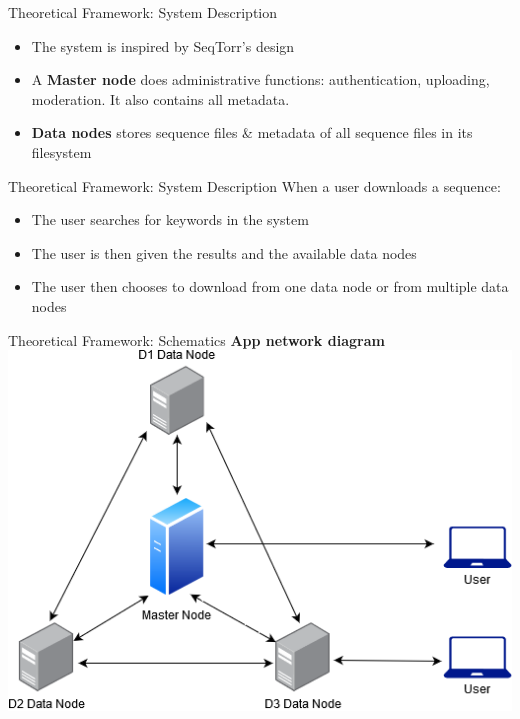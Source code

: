 \documentclass{beamer}
\begin{document}
\begin{frame}{Theoretical Framework: System Description}
    \begin{itemize}
        \item The system is inspired by SeqTorr's design
        \item A \textbf{Master node} does administrative functions: authentication, uploading, moderation. It also contains all metadata.
        \item \textbf{Data nodes} stores sequence files \& metadata of all sequence files in its filesystem
    \end{itemize}
\end{frame}
\begin{frame}{Theoretical Framework: System Description}
    When a user downloads a sequence:
    \begin{itemize}
        \item The user searches for keywords in the system
        \item The user is then given the results and the available data nodes
        \item The user then chooses to download from one data node or from multiple data nodes
    \end{itemize}
\end{frame}

\begin{frame}{Theoretical Framework: Schematics}
\textbf{App network diagram} \\ \medskip
\centering
\includegraphics[scale=0.5]{images/thesis1.png}
\end{frame}
\end{document}
